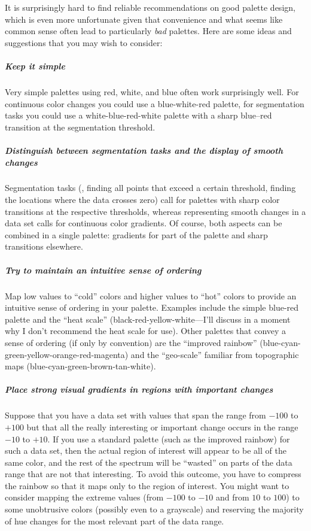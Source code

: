 It is surprisingly hard to find reliable recommendations on good
palette design, which is even more unfortunate given that convenience
and what seems like common sense often lead to particularly \emph{bad}
palettes. Here are some ideas and suggestions that you may wish to
consider:
\begin{unnumlist}
\subparagraph{Keep it simple}
\item Very simple palettes using red, white, and blue
  often work surprisingly well. For continuous color changes you could
  use a blue-white-red palette, for segmentation tasks you could use
  a white-blue-red-white palette with a sharp blue--red transition
  at the segmentation threshold.

\subparagraph{Distinguish between segmentation tasks and the display of smooth
  changes}
\item Segmentation tasks (\eg, finding all points that exceed a
  certain threshold, finding the locations where the data crosses
  zero) call for palettes with sharp color transitions at the
  respective thresholds, whereas representing smooth changes in a data
  set calls for continuous color gradients. Of course, both aspects
  can be combined in a single palette: gradients for part of the
  palette and sharp transitions elsewhere.

\subparagraph{Try to maintain an intuitive sense of ordering}
\item Map low values
  to ``cold'' colors and higher values to ``hot'' colors to provide an
  intuitive sense of ordering in your palette. Examples include the
  simple blue-red palette and the ``heat scale'' 
  (black-red-yellow-white---I'll discuss in a moment why I don't
  recommend the heat scale for use). Other palettes that convey a
  sense of ordering (if only by convention) are the ``improved
  rainbow'' (blue-cyan-green-\break yellow-orange-red-magenta) and the
  ``geo-scale'' familiar from topographic maps
  (blue-cyan-green-brown-tan-white).\pagebreak

\subparagraph{Place strong visual gradients in regions with important changes}
\item
  Suppose that you have a data set with values that span the range
  from $-100$ to $+100$ but that all the really interesting or
  important change occurs in the range $-10$ to $+10$. If you use a
  standard palette (such as the improved rainbow) for such a data set,
  then the actual region of interest will appear to be all of the same
  color, and the rest of the spectrum will be ``wasted'' on parts of
  the data range that are not that interesting.  To avoid this
  outcome, you have to compress the rainbow so that it maps only to
  the region of interest. You might want to consider mapping the
  extreme values (from $-100$ to $-10$ and from $10$ to $100$) to some
  unobtrusive colors (possibly even to a grayscale) and reserving the
  majority of hue changes for the most relevant part of the data
  range.


\end{unnumlist}
